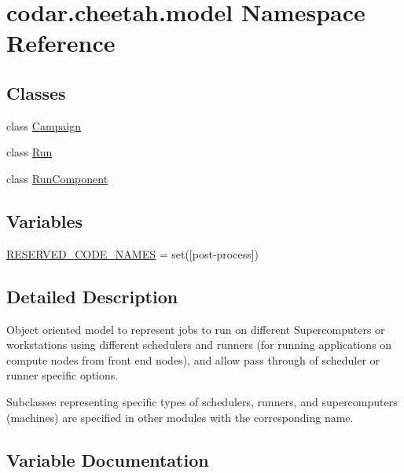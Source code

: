 \hypertarget{namespacecodar_1_1cheetah_1_1model}{}\section{codar.\+cheetah.\+model Namespace Reference}
\label{namespacecodar_1_1cheetah_1_1model}
\subsection*{Classes}
\begin{DoxyCompactItemize}
\item 
class \hyperlink{classcodar_1_1cheetah_1_1model_1_1_campaign}{Campaign}
\item 
class \hyperlink{classcodar_1_1cheetah_1_1model_1_1_run}{Run}
\item 
class \hyperlink{classcodar_1_1cheetah_1_1model_1_1_run_component}{Run\+Component}
\end{DoxyCompactItemize}
\subsection*{Variables}
\begin{DoxyCompactItemize}
\item 
\hyperlink{namespacecodar_1_1cheetah_1_1model_a7d8bea761417a3809aef433e77fd2887}{R\+E\+S\+E\+R\+V\+E\+D\+\_\+\+C\+O\+D\+E\+\_\+\+N\+A\+M\+ES} = set(\mbox{[}\textquotesingle{}post-\/process\textquotesingle{}\mbox{]})
\end{DoxyCompactItemize}


\subsection{Detailed Description}
\begin{DoxyVerb}Object oriented model to represent jobs to run on different Supercomputers or
workstations using different schedulers and runners (for running applications
on compute nodes from front end nodes), and allow pass through of scheduler
or runner specific options.

Subclasses representing specific types of schedulers, runners, and
supercomputers (machines) are specified in other modules with the corresponding
name.
\end{DoxyVerb}
 

\subsection{Variable Documentation}
\mbox{\label{namespacecodar_1_1cheetah_1_1model_a7d8bea761417a3809aef433e77fd2887}} 

